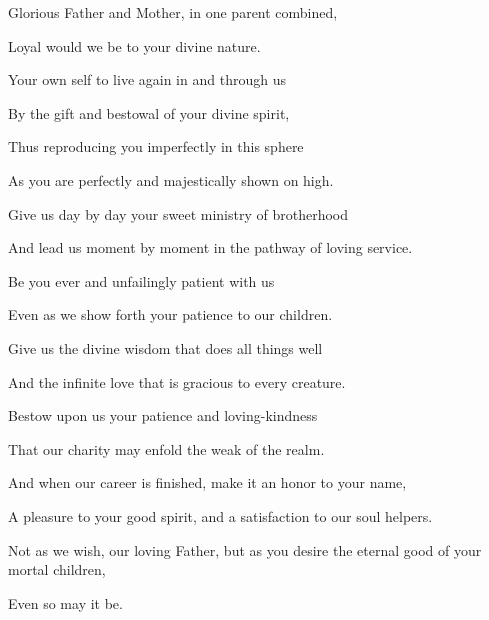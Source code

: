 \separatorshort
\begin{quoting}[vskip=\baselineskip,leftmargin=4ex,rightmargin=2ex]
\setlength{\parindent}{-0.7em}
\hspace*{-1.2em}
Glorious Father and Mother, in one parent combined,\par
Loyal would we be to your divine nature.\par
Your own self to live again in and through us\par
By the gift and bestowal of your divine spirit,\par
Thus reproducing you imperfectly in this sphere\par
As you are perfectly and majestically shown on high.\par
Give us day by day your sweet ministry of brotherhood\par
And lead us moment by moment in the pathway of loving service.\par
Be you ever and unfailingly patient with us\par
Even as we show forth your patience to our children.\par
Give us the divine wisdom that does all things well\par
And the infinite love that is gracious to every creature.\par
Bestow upon us your patience and loving\hyp{}kindness\par
That our charity may enfold the weak of the realm.\par
And when our career is finished, make it an honor to your name,\par
A pleasure to your good spirit, and a satisfaction to our soul helpers.\par
Not as we wish, our loving Father, but as you desire the eternal good of your mortal children,\par
Even so may it be.\par
\end{quoting}
\separatorshort
